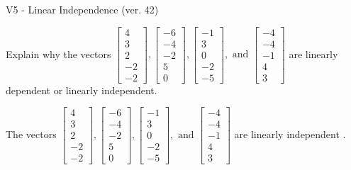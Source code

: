 \begin{exercise}
  \begin{exerciseTitle}V5 - Linear Independence (ver. 42)\end{exerciseTitle}
  \begin{exerciseStatement}
    Explain why the vectors \(\left[\begin{array}{r}
4 \\
3 \\
2 \\
-2 \\
-2
\end{array}\right] , \left[\begin{array}{r}
-6 \\
-4 \\
-2 \\
5 \\
0
\end{array}\right] , \left[\begin{array}{r}
-1 \\
3 \\
0 \\
-2 \\
-5
\end{array}\right] , \text{ and } \left[\begin{array}{r}
-4 \\
-4 \\
-1 \\
4 \\
3
\end{array}\right]\) are linearly dependent or linearly independent.	


  \end{exerciseStatement}
  \begin{exerciseAnswer}
   The vectors \(\left[\begin{array}{r}
4 \\
3 \\
2 \\
-2 \\
-2
\end{array}\right] , \left[\begin{array}{r}
-6 \\
-4 \\
-2 \\
5 \\
0
\end{array}\right] , \left[\begin{array}{r}
-1 \\
3 \\
0 \\
-2 \\
-5
\end{array}\right] , \text{ and } \left[\begin{array}{r}
-4 \\
-4 \\
-1 \\
4 \\
3
\end{array}\right]\) are 
  	 linearly independent  .
  


  \end{exerciseAnswer}
\end{exercise}